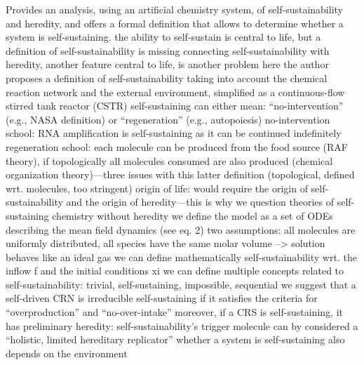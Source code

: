 \markdownRendererDocumentBegin
{} Provides an analysis, using an artificial chemistry system, of self-sustainability and heredity, and offers a formal definition that allows to determine whether a system is self-sustaining.\markdownRendererInterblockSeparator
{}\markdownRendererUlBegin
\markdownRendererUlItem the ability to self-sustain is central to life, but a definition of self-sustainability is missing\markdownRendererUlItemEnd 
\markdownRendererUlItem connecting self-sustainability with heredity, another feature central to life, is another problem\markdownRendererUlItemEnd 
\markdownRendererUlItem here the author proposes a definition of self-sustainability taking into account the chemical reaction network and the external environment, simplified as a continuous-flow stirred tank reactor (CSTR)\markdownRendererUlItemEnd 
\markdownRendererUlItem self-sustaining can either mean: “no-intervention” (e.g., NASA definition) or “regeneration” (e.g., autopoiesis)\markdownRendererUlItemEnd 
\markdownRendererUlItem no-intervention school: RNA amplification is self-sustaining as it can be continued indefinitely\markdownRendererUlItemEnd 
\markdownRendererUlItem regeneration school: each molecule can be produced from the food source (RAF theory), if topologically all molecules consumed are also produced (chemical organization theory)—three issues with this latter definition (topological, defined wrt. molecules, too stringent)\markdownRendererUlItemEnd 
\markdownRendererUlItem origin of life: would require the origin of self-sustainability and the origin of heredity—this is why we question theories of self-sustaining chemistry without heredity\markdownRendererUlItemEnd 
\markdownRendererUlItem we define the model as a set of ODEs describing the mean field dynamics (see eq. 2)\markdownRendererUlItemEnd 
\markdownRendererUlItem two assumptions: all molecules are uniformly distributed, all species have the same molar volume --> solution behaves like an ideal gas\markdownRendererUlItemEnd 
\markdownRendererUlItem we can define mathematically self-sustainability wrt. the inflow f and the initial conditions xi\markdownRendererUlItemEnd 
\markdownRendererUlItem we can define multiple concepts related to self-sustainability: trivial, self-sustaining, impossible, sequential\markdownRendererUlItemEnd 
\markdownRendererUlItem we suggest that a self-driven CRN is irreducible self-sustaining if it satisfies the criteria for “overproduction” and “no-over-intake”\markdownRendererUlItemEnd 
\markdownRendererUlItem moreover, if a CRS is self-sustaining, it has preliminary heredity: self-sustainability’s trigger molecule can by considered a “holistic, limited hereditary replicator”\markdownRendererUlItemEnd 
\markdownRendererUlItem whether a system is self-sustaining also depends on the environment\markdownRendererUlItemEnd 
\markdownRendererUlEnd \markdownRendererDocumentEnd